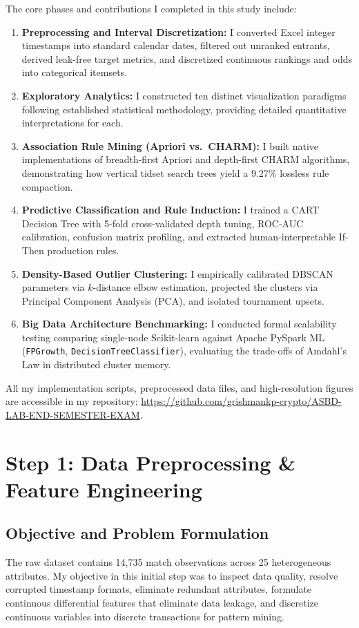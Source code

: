 \documentclass[10pt,journal]{IEEEtran}
\begin{document}
The core phases and contributions I completed in this study include:
\begin{enumerate}
    \item \textbf{Preprocessing and Interval Discretization:} I converted Excel integer timestamps into standard calendar dates, filtered out unranked entrants, derived leak-free target metrics, and discretized continuous rankings and odds into categorical itemsets.
    \item \textbf{Exploratory Analytics:} I constructed ten distinct visualization paradigms following established statistical methodology, providing detailed quantitative interpretations for each.
    \item \textbf{Association Rule Mining (Apriori vs.\ CHARM):} I built native implementations of breadth-first Apriori and depth-first CHARM algorithms, demonstrating how vertical tidset search trees yield a 9.27\% lossless rule compaction.
    \item \textbf{Predictive Classification and Rule Induction:} I trained a CART Decision Tree with 5-fold cross-validated depth tuning, ROC-AUC calibration, confusion matrix profiling, and extracted human-interpretable If-Then production rules.
    \item \textbf{Density-Based Outlier Clustering:} I empirically calibrated DBSCAN parameters via $k$-distance elbow estimation, projected the clusters via Principal Component Analysis (PCA), and isolated tournament upsets.
    \item \textbf{Big Data Architecture Benchmarking:} I conducted formal scalability testing comparing single-node Scikit-learn against Apache PySpark ML (\texttt{FPGrowth}, \texttt{DecisionTreeClassifier}), evaluating the trade-offs of Amdahl's Law in distributed cluster memory.
\end{enumerate}

All my implementation scripts, preprocessed data files, and high-resolution figures are accessible in my repository: \textcolor{blue}{\url{https://github.com/grishmankp-crypto/ASBD-LAB-END-SEMESTER-EXAM}}.

\section{Step 1: Data Preprocessing \& Feature Engineering}

\subsection{Objective and Problem Formulation}
The raw dataset contains 14,735 match observations across 25 heterogeneous attributes. My objective in this initial step was to inspect data quality, resolve corrupted timestamp formats, eliminate redundant attributes, formulate continuous differential features that eliminate data leakage, and discretize continuous variables into discrete transactions for pattern mining.
\end{document}
